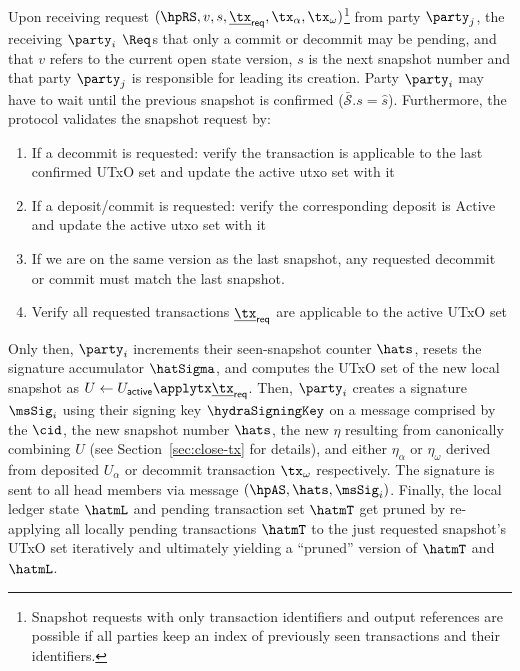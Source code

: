 \quad Upon receiving request
$(\hpRS,v,s,\underline{\tx}_{\mathsf{req}}, \tx_\alpha, \tx_\omega)$\footnote{Snapshot
  requests with only transaction identifiers and output references are possible
  if all parties keep an index of previously seen transactions and their
  identifiers.} from party $\party_j$, the receiving $\party_i$ $\Req$s that
only a commit or decommit may be pending, and that $v$ refers to the current
open state version, $s$ is the next snapshot number and that party $\party_j$ is
responsible for leading its creation. Party $\party_i$ may have to wait until
the previous snapshot is confirmed ($\bar{\mathcal{S}}.s = \hat{s}$).
Furthermore, the protocol validates the snapshot request by:
\begin{enumerate}
  \item If a decommit is requested: verify the transaction is applicable to the
        last confirmed UTxO set and update the active utxo set with it
  \item If a deposit/commit is requested: verify the corresponding deposit is
        $\text{Active}$ and update the active utxo set with it
  \item If we are on the same version as the last snapshot, any requested
        decommit or commit must match the last snapshot.
  \item Verify all requested transactions $\underline{\tx}_{\mathsf{req}}$ are
        applicable to the active UTxO set
\end{enumerate}
Only then, $\party_i$ increments their seen-snapshot counter $\hats$, resets the
signature accumulator $\hatSigma$, and computes the UTxO set of the new local
snapshot as
$U \gets U_{\mathsf{active}} \applytx \underline{\tx}_{\mathsf{req}}$. Then,
$\party_i$ creates a signature $\msSig_i$ using their signing key
$\hydraSigningKey$ on a message comprised by the $\cid$, the new snapshot number
$\hats$, the new $\eta$ resulting from canonically combining $U$ (see
Section~\ref{sec:close-tx} for details), and either $\eta_{\alpha}$ or
$\eta_{\omega}$ derived from deposited $U_{\alpha}$ or decommit transaction
$\tx_{\omega}$ respectively. The signature is sent to all head members via
message $(\hpAS,\hats,\msSig_i)$. Finally, the local ledger state $\hatmL$ and
pending transaction set $\hatmT$ get pruned by re-applying all locally pending
transactions $\hatmT$ to the just requested snapshot's UTxO set iteratively and
ultimately yielding a ``pruned'' version of $\hatmT$ and $\hatmL$. \\

